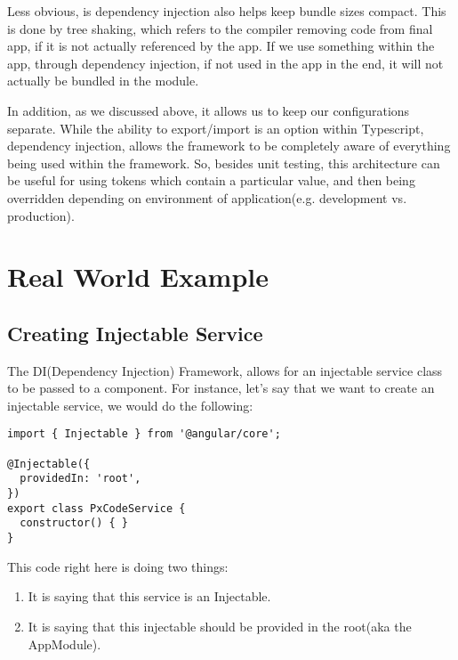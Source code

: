 Less obvious, is dependency injection also helps keep bundle sizes compact.
This is done by tree shaking, which refers to the compiler removing code from 
final app, if it is not actually referenced by the app. If we use something 
within the app, through dependency injection, if not used in the app in the 
end, it will not actually be bundled in the module.

In addition, as we discussed above, it allows us to keep our configurations 
separate. While the ability to export/import is an option within Typescript, 
dependency injection, allows the framework to be completely aware of everything
being used within the framework. So, besides unit testing, this architecture 
can be useful for using tokens which contain a particular value, and then 
being overridden depending on environment of application(e.g. development vs.
production).

\section{ Real World Example }

\subsection{ Creating Injectable Service }
The DI(Dependency Injection) Framework, allows for an injectable service class
to be passed to a component. For instance, let's say that we want to create an
injectable service, we would do the following:
\begin{lstlisting}
import { Injectable } from '@angular/core';

@Injectable({
  providedIn: 'root',
})
export class PxCodeService {
  constructor() { }
}
\end{lstlisting}

This code right here is doing two things:
\begin{enumerate}
  \item It is saying that this service is an Injectable.
  \item It is saying that this injectable should be provided in the root(aka the
  AppModule).
\end{enumerate}


